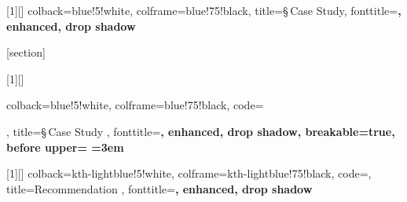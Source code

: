 [1][]{
  colback=blue!5!white,
  colframe=blue!75!black,
  title={\S\thesubsubsection\,Case Study},
  fonttitle=\bfseries,
  enhanced,
  drop shadow
}

{}[section]
\renewcommand{\thecasestudyCounter}{\thesection.\arabic{casestudyCounter}}

[1][]{
  colback=blue!5!white,
  colframe=blue!75!black,
  code={%
  },
  title={\S\thesection\,Case Study },
  fonttitle=\bfseries,
  enhanced,
  drop shadow,
  breakable=true,
  before upper={%
    \emergencystretch=3em
  }
}

[1][]{
  colback=kth-lightblue!5!white,
  colframe=kth-lightblue!75!black,
  code={},
  title={Recommendation \thereccount{}}, %
  fonttitle=\bfseries,
  enhanced,
  drop shadow
}


\usepackage{fancyvrb,fvextra}
\usepackage{csquotes}               %




